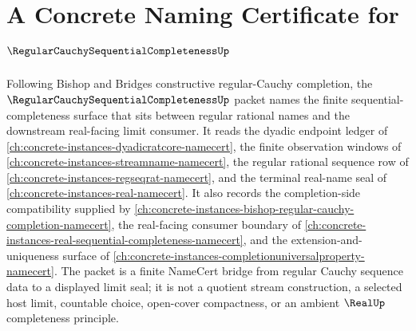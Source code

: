 \chapter{A Concrete Naming Certificate for $\RegularCauchySequentialCompletenessUp$}
\label{ch:concrete-instances-regular-cauchy-sequential-completeness-namecert}

Following Bishop and Bridges constructive regular-Cauchy completion, the $\RegularCauchySequentialCompletenessUp$ packet names the finite sequential-completeness surface that sits between regular rational names and the downstream real-facing limit consumer. It reads the dyadic endpoint ledger of \autoref{ch:concrete-instances-dyadicratcore-namecert}, the finite observation windows of \autoref{ch:concrete-instances-streamname-namecert}, the regular rational sequence row of \autoref{ch:concrete-instances-regseqrat-namecert}, and the terminal real-name seal of \autoref{ch:concrete-instances-real-namecert}. It also records the completion-side compatibility supplied by \autoref{ch:concrete-instances-bishop-regular-cauchy-completion-namecert}, the real-facing consumer boundary of \autoref{ch:concrete-instances-real-sequential-completeness-namecert}, and the extension-and-uniqueness surface of \autoref{ch:concrete-instances-completionuniversalproperty-namecert}. The packet is a finite NameCert bridge from regular Cauchy sequence data to a displayed limit seal; it is not a quotient stream construction, a selected host limit, countable choice, open-cover compactness, or an ambient $\RealUp$ completeness principle.

